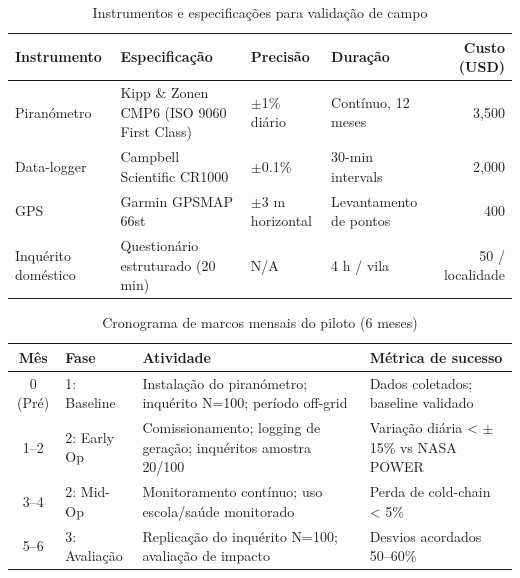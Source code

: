 \documentclass[12pt, a4paper]{article}
\begin{document}
\begin{table}[H]
\centering
\caption{Instrumentos e especificações para validação de campo}
\label{tab:validation_instruments}
\footnotesize
\begin{tabular}{@{}p{3.5cm}p{5cm}p{2.5cm}p{2.5cm}r@{}}
\toprule
\rowcolor{LightBlue}\textbf{Instrumento} & \textbf{Especificação} & \textbf{Precisão} & \textbf{Duração} & \textbf{Custo (USD)} \\
\midrule
Piranómetro & Kipp \& Zonen CMP6 (ISO 9060 First Class) & $\pm$1\% diário & Contínuo, 12 meses & 3,500 \\
Data-logger & Campbell Scientific CR1000 & $\pm$0.1\% & 30-min intervals & 2,000 \\
GPS & Garmin GPSMAP 66st & $\pm$3 m horizontal & Levantamento de pontos & 400 \\
Inquérito doméstico & Questionário estruturado (20 min) & N/A & 4 h / vila & 50 / localidade \\
\bottomrule
\end{tabular}
\end{table}

\begin{table}[H]
\centering
\caption{Cronograma de marcos mensais do piloto (6 meses)}
\label{tab:validation_timeline}

\small
\begin{tabular}{clp{7cm}|p{3.5cm}|}
\toprule
\rowcolor{LightBlue}\textbf{Mês} & \textbf{Fase} & \textbf{Atividade} & \textbf{Métrica de sucesso} \\
\midrule
0 (Pré) & 1: Baseline & Instalação do piranómetro; inquérito N=100; período off-grid & Dados coletados; baseline validado \\
\midrule
1--2 & 2: Early Op & Comissionamento; logging de geração; inquéritos amostra 20/100 & Variação diária < $\pm$15\% vs NASA POWER \\
\midrule
3--4 & 2: Mid-Op & Monitoramento contínuo; uso escola/saúde monitorado & Perda de cold-chain < 5\% \\
\midrule
5--6 & 3: Avaliação & Replicação do inquérito N=100; avaliação de impacto & Desvios acordados 50--60\% \\
\bottomrule
\end{tabular}
\end{table}
\end{document}
